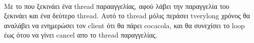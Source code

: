 \documentclass{article}
\begin{document}
\paragraph{}
Με το που ξεκινάει ένα thread παρααγγελίας, αφού λάβει την παραγγελία του ξεκινάει και ένα δεύτερο thread. Αυτό το thread μόλις περάσει tverylong χρόνος θα αναλάβει να ενημερώσει τον client ότι θα πάρει cocacola, και θα συνεχίσει το loop έως ότου να γίνει cancel απο το thread παραγγελίας.
\end{document}

